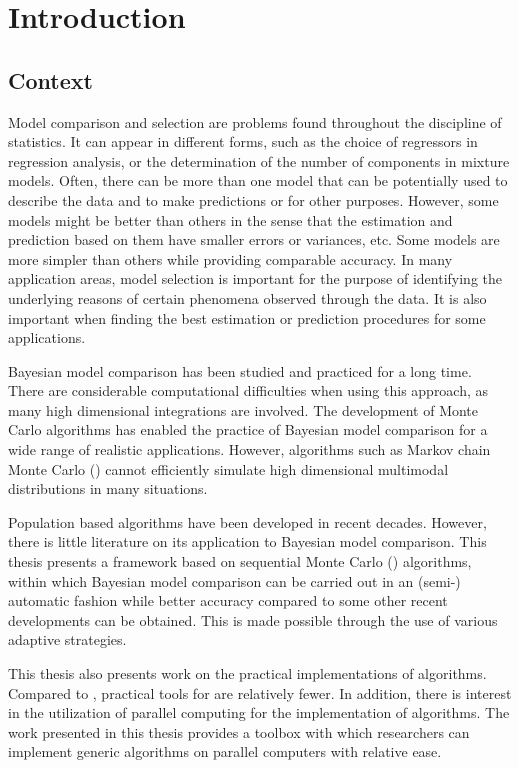 \chapter{Introduction}
\label{cha:Introduction}

\section{Context}
\label{sec:Context}

Model comparison and selection are problems found throughout the discipline
of statistics. It can appear in different forms, such as the choice of
regressors in regression analysis, or the determination of the number of
components in mixture models. Often, there can be more than one model that
can be potentially used to describe the data and to make predictions or for
other purposes. However, some models might be better than others in the sense
that the estimation and prediction based on them have smaller errors or
variances, etc. Some models are more simpler than others while providing
comparable accuracy. In many application areas, model selection is important
for the purpose of identifying the underlying reasons of certain phenomena
observed through the data. It is also important when finding the best
estimation or prediction procedures for some applications.

Bayesian model comparison has been studied and practiced for a long time.
There are considerable computational difficulties when using this approach,
as many high dimensional integrations are involved. The development of Monte
Carlo algorithms has enabled the practice of Bayesian model comparison for a
wide range of realistic applications. However, algorithms such as Markov
chain Monte Carlo (\mcmc) cannot efficiently simulate high dimensional
multimodal distributions in many situations.

Population based algorithms have been developed in recent decades. However,
there is little literature on its application to Bayesian model comparison.
This thesis presents a framework based on sequential Monte Carlo (\smc)
algorithms, within which Bayesian model comparison can be carried out in an
(semi-) automatic fashion while better accuracy compared to some other recent
developments can be obtained. This is made possible through the use of
various adaptive strategies.

This thesis also presents work on the practical implementations of \smc
algorithms. Compared to \mcmc, practical tools for \smc are relatively fewer.
In addition, there is interest in the utilization of parallel computing for
the implementation of \smc algorithms. The work presented in this thesis
provides a toolbox with which researchers can implement generic \smc
algorithms on parallel computers with relative ease.


